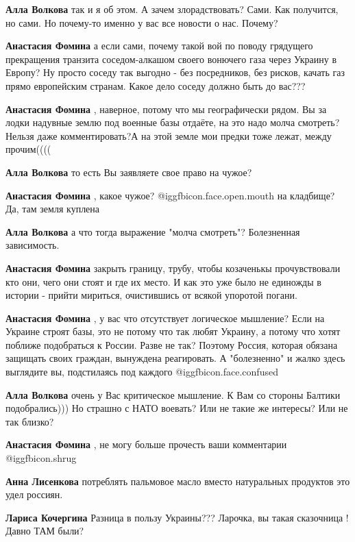 \begin{itemize}
\begin{itemize}
\textbf{Алла Волкова} так и я об этом. А зачем злорадствовать? Сами. Как получится, но сами. Но почему-то именно у вас все новости о нас. Почему?

\textbf{Анастасия Фомина} а если сами, почему такой вой по поводу грядущего прекращения транзита соседом-алкашом своего вонючего газа через Украину в Европу? Ну просто соседу так выгодно - без посредников, без рисков, качать газ прямо европейским странам. Какое дело соседу должно быть до вас???

\textbf{Анастасия Фомина} , наверное, потому что мы географически рядом. Вы за лодки надувные землю под военные базы отдаёте, на это надо молча смотреть? Нельзя даже комментировать?А на этой земле мои предки тоже лежат, между прочим((((

\textbf{Алла Волкова} то есть Вы заявляете свое право на чужое?

\textbf{Анастасия Фомина} , какое чужое?  @igg{fbicon.face.open.mouth}  на кладбище? Да, там земля куплена

\textbf{Алла Волкова} а что тогда выражение "молча смотреть"? Болезненная зависимость.

\textbf{Анастасия Фомина} закрыть границу, трубу, чтобы козаченькы прочувствовали кто они, чего они стоят и где их место. И как это уже было не единожды в истории - прийти мириться, очистившись от всякой упоротой погани.

\textbf{Анастасия Фомина} , у вас что отсутствует логическое мышление? Если на Украине строят базы, это не потому что так любят Украину, а потому что хотят поближе подобраться к России. Разве не так? Поэтому Россия, которая обязана защищать своих граждан, вынуждена реагировать. А "болезненно" и жалко здесь выглядите вы, подстилаясь под каждого @igg{fbicon.face.confused} 

\textbf{Алла Волкова} очень у Вас критическое мышление. К Вам со стороны Балтики подобрались))) Но страшно с НАТО воевать? Или не такие же интересы? Или не так близко?

\textbf{Анастасия Фомина} , не могу больше прочесть ваши комментарии  @igg{fbicon.shrug} 

\textbf{Анна Лисенкова} потреблять пальмовое масло вместо натуральных продуктов это удел россиян.

\textbf{Лариса Кочергина} Разница в пользу Украины??? Ларочка, вы такая сказочница !
Давно ТАМ были?


\end{itemize}
\end{itemize}
